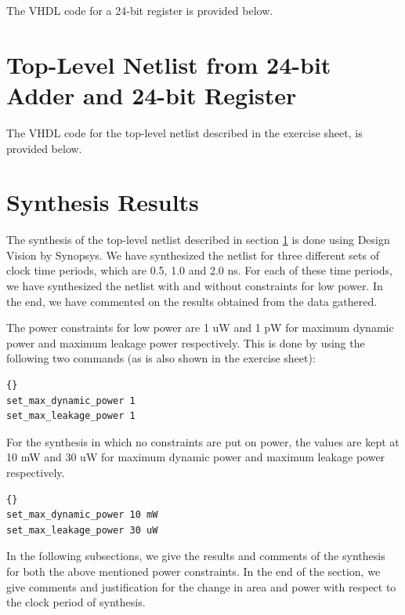 \documentclass[11pt,a4paper]{article}
\begin{document}
The VHDL code for a 24-bit register is provided below.\\ 



\section{Top-Level Netlist from 24-bit Adder and 24-bit Register}
\label{sec:netlist}

The VHDL code for the top-level netlist described in the exercise sheet, is provided below.\\ 


\section{Synthesis Results}

The synthesis of the top-level netlist described in section \ref{sec:netlist} is done using Design Vision by Synopsys. We have synthesized the netlist for three different sets of clock time periods, which are 0.5, 1.0 and 2.0 ns. For each of these time periods, we have synthesized the netlist with and without constraints for low power. In the end, we have commented on the results obtained from the data gathered.

The power constraints for low power are 1 uW and 1 pW for maximum dynamic power and maximum leakage power respectively. This is done by using the following two commands (as is also shown in the exercise sheet):\\

\begin{lstlisting}[frame=trbl]{}
set_max_dynamic_power 1
set_max_leakage_power 1
\end{lstlisting}
\vspace{0.5cm}
For the synthesis in which no constraints are put on power, the values are kept at 10 mW and 30 uW for maximum dynamic power and maximum leakage power respectively.\\

\begin{lstlisting}[frame=trbl]{}
set_max_dynamic_power 10 mW
set_max_leakage_power 30 uW
\end{lstlisting}
\vspace{0.5cm}

In the following subsections, we give the results and comments of the synthesis for both the above mentioned power constraints. In the end of the section, we give comments and justification for the change in area and power with respect to the clock period of synthesis.
\end{document}
